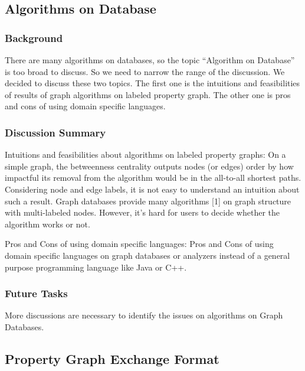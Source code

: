 \documentclass[runningheads]{llncs}
\begin{document}
\subsection{Algorithms on Database}
\subsubsection{Background}
There are many algorithms on databases, so the topic “Algorithm on Database” is too broad to discuss. So we need to narrow the range of the discussion. We decided to discuss these two topics. The first one is the intuitions and feasibilities of results of graph algorithms on labeled property graph. The other one is pros and cons of using domain specific languages.

\subsubsection{Discussion Summary}
Intuitions and feasibilities about algorithms on labeled property graphs: On a simple graph, the betweenness centrality outputs nodes (or edges) order by how impactful its removal from the algorithm would be in the all-to-all shortest paths. Considering node and edge labels, it is not easy to understand an intuition about such a result. Graph databases provide many algorithms [1] on graph structure with multi-labeled nodes. However, it’s hard for users to decide whether the algorithm works or not.

Pros and Cons of using domain specific languages: Pros and Cons of using domain specific languages on graph databases or analyzers instead of a general purpose programming language like Java or C++.

\subsubsection{Future Tasks}
More discussions are necessary to identify the issues on algorithms on Graph Databases.

\subsection{Property Graph Exchange Format}
\end{document}
